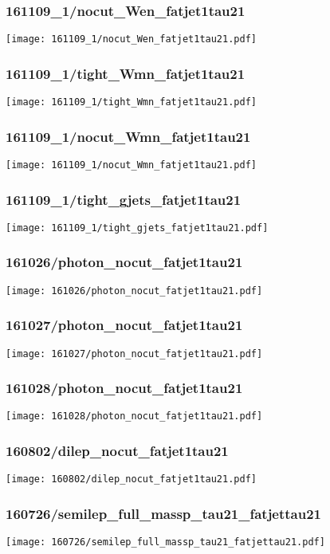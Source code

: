 \begin{frame}
   \frametitle{\small 161109\_1/nocut\_Wen\_fatjet1tau21}
   \centering
   \texttt{[image: 161109\_1/nocut\_Wen\_fatjet1tau21.pdf]}
\end{frame}

\begin{frame}
   \frametitle{\small 161109\_1/tight\_Wmn\_fatjet1tau21}
   \centering
   \texttt{[image: 161109\_1/tight\_Wmn\_fatjet1tau21.pdf]}
\end{frame}

\begin{frame}
   \frametitle{\small 161109\_1/nocut\_Wmn\_fatjet1tau21}
   \centering
   \texttt{[image: 161109\_1/nocut\_Wmn\_fatjet1tau21.pdf]}
\end{frame}

\begin{frame}
   \frametitle{\small 161109\_1/tight\_gjets\_fatjet1tau21}
   \centering
   \texttt{[image: 161109\_1/tight\_gjets\_fatjet1tau21.pdf]}
\end{frame}

\begin{frame}
   \frametitle{\small 161026/photon\_nocut\_fatjet1tau21}
   \centering
   \texttt{[image: 161026/photon\_nocut\_fatjet1tau21.pdf]}
\end{frame}

\begin{frame}
   \frametitle{\small 161027/photon\_nocut\_fatjet1tau21}
   \centering
   \texttt{[image: 161027/photon\_nocut\_fatjet1tau21.pdf]}
\end{frame}

\begin{frame}
   \frametitle{\small 161028/photon\_nocut\_fatjet1tau21}
   \centering
   \texttt{[image: 161028/photon\_nocut\_fatjet1tau21.pdf]}
\end{frame}

\begin{frame}
   \frametitle{\small 160802/dilep\_nocut\_fatjet1tau21}
   \centering
   \texttt{[image: 160802/dilep\_nocut\_fatjet1tau21.pdf]}
\end{frame}

\begin{frame}
   \frametitle{\small 160726/semilep\_full\_massp\_tau21\_fatjettau21}
   \centering
   \texttt{[image: 160726/semilep\_full\_massp\_tau21\_fatjettau21.pdf]}
\end{frame}

